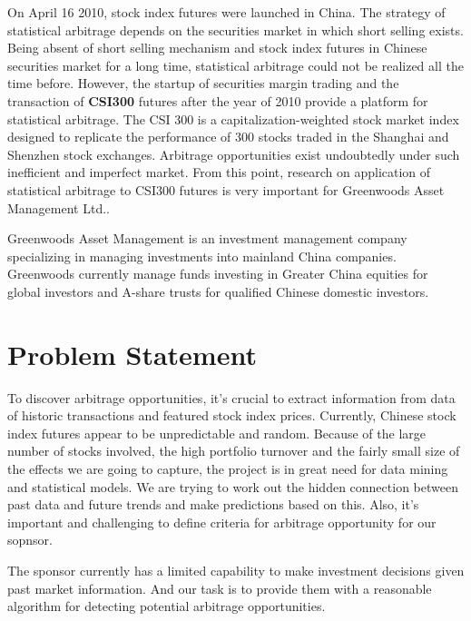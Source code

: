 \documentclass[12pt,letterpaper]{article}
\theoremstyle{definition}
\begin{document}
 \vspace{6pt}\noindent On April 16 2010, stock index futures were launched in China. The strategy of statistical arbitrage depends on the securities market in which short selling exists. Being absent of short selling mechanism and stock index futures in Chinese securities market for a long time, statistical arbitrage could not be realized all the time before. However, the startup of securities margin trading and the transaction of \textbf{CSI300} futures after the year of 2010 provide a platform for statistical arbitrage. The CSI 300 is a capitalization-weighted stock market index designed to replicate the performance of 300 stocks traded in the Shanghai and Shenzhen stock exchanges. Arbitrage opportunities exist undoubtedly under such inefficient and imperfect market. From this point, research on application of statistical arbitrage to CSI300 futures is very important for Greenwoods Asset Management Ltd.. 

 \vspace{6pt}\noindent Greenwoods Asset Management is an investment management company specializing in managing investments into mainland China companies. Greenwoods currently manage funds investing in Greater China equities for global investors and A-share trusts for qualified Chinese domestic investors.


\section{Problem Statement}

To discover arbitrage opportunities, it’s crucial to extract information from data of historic transactions and featured stock index prices. Currently, Chinese stock index futures appear to be unpredictable and random. Because of the large number of stocks involved, the high portfolio turnover and the fairly small size of the effects we are going to capture, the project is in great need for data mining and statistical models. We are trying to work out the hidden connection between past data and future trends and make predictions based on this. Also, it’s important and challenging to define criteria for arbitrage opportunity for our sopnsor.

\vspace{6pt}\noindent The sponsor currently has a limited capability to make investment decisions given past market information. And our task is to provide them with a reasonable algorithm for detecting potential arbitrage opportunities.
\end{document}
